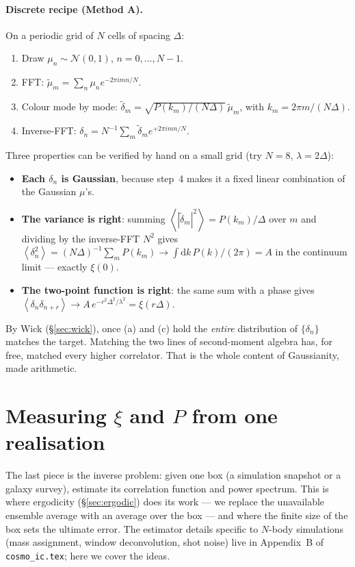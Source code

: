 \documentclass[12pt]{article}
\newcommand{\avg}[1]{\left\langle #1 \right\rangle}
\newcommand{\code}[1]{\texttt{#1}}
\begin{document}
\paragraph{Discrete recipe (Method A).}  On a periodic grid of $N$ cells
of spacing $\Delta$:
\begin{enumerate}
  \item Draw $\mu_n \sim \mathcal N(0,1)$, $n = 0,\dots,N-1$.
  \item FFT: $\tilde\mu_m = \sum_n \mu_n e^{-2\pi i mn/N}$.
  \item Colour mode by mode: $\tilde\delta_m =
        \sqrt{P(k_m)/(N\Delta)}\,\tilde\mu_m$, with $k_m = 2\pi m/(N\Delta)$.
  \item Inverse-FFT: $\delta_n = N^{-1}\sum_m \tilde\delta_m e^{+2\pi i mn/N}$.
\end{enumerate}
Three properties can be verified by hand on a small grid (try $N = 8$,
$\lambda = 2\Delta$):
\begin{itemize}
  \item[(a)] \textbf{Each $\delta_n$ is Gaussian}, because step~4 makes it
        a fixed linear combination of the Gaussian $\mu$'s.
  \item[(b)] \textbf{The variance is right}: summing
        $\avg{|\tilde\delta_m|^2} = P(k_m)/\Delta$ over $m$ and dividing
        by the inverse-FFT $N^2$ gives $\avg{\delta_n^2} = (N\Delta)^{-1}
        \sum_m P(k_m) \to \int\mathrm dk\,P(k)/(2\pi) = A$ in the
        continuum limit --- exactly $\xi(0)$.
  \item[(c)] \textbf{The two-point function is right}: the same sum with
        a phase gives $\avg{\delta_n\delta_{n+r}} \to A\,e^{-r^2\Delta^2/
        \lambda^2} = \xi(r\Delta)$.
\end{itemize}
By Wick (\S\ref{sec:wick}), once (a) and (c) hold the \emph{entire}
distribution of $\{\delta_n\}$ matches the target.  Matching the two
lines of second-moment algebra has, for free, matched every higher
correlator.  That is the whole content of Gaussianity, made arithmetic.

\section{Measuring $\xi$ and $P$ from one realisation}
\label{sec:estimate}

The last piece is the inverse problem: given one box (a simulation
snapshot or a galaxy survey), estimate its correlation function and power
spectrum.  This is where ergodicity (\S\ref{sec:ergodic}) does its work
--- we replace the unavailable ensemble average with an average over the
box --- and where the finite size of the box sets the ultimate error.
The estimator details specific to $N$-body simulations (mass assignment,
window deconvolution, shot noise) live in Appendix~B of
\code{cosmo\_ic.tex}; here we cover the ideas.
\end{document}
